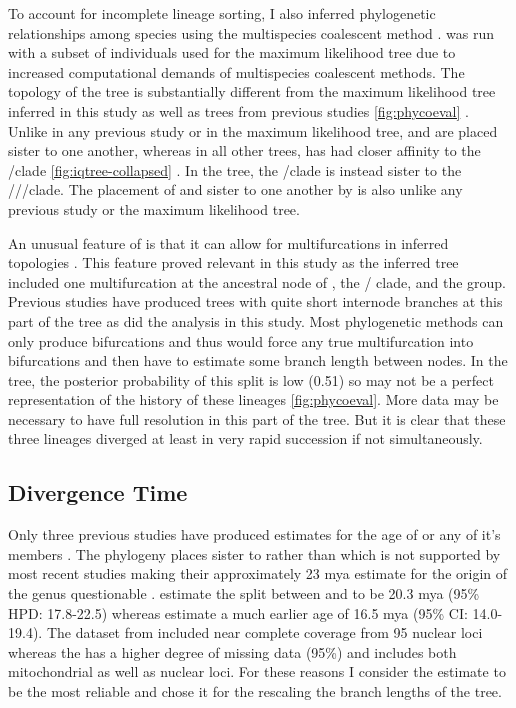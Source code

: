 To account for incomplete lineage sorting, I also inferred phylogenetic     
relationships among \anaxyrus species using the multispecies coalescent 
method \phycoeval. 
\phycoeval was run with a subset of individuals used for the maximum likelihood 
tree due to increased computational demands of multispecies coalescent methods. 
The topology of the \phycoeval tree is substantially different from the  
maximum likelihood tree inferred in this study as well as trees from previous 
studies \cref{fig:phycoeval} \parencite{fontenot2011,graybeal1997,masta2002,pramuk2007,pyron2011,portik2023}. 
Unlike in any previous study or in the maximum likelihood tree, \amer and \terr are 
placed sister to one another, whereas in all other trees, \amer has had closer 
affinity to the \hemiophrys/\baxteri clade \cref{fig:iqtree-collapsed} \parencite{pyron2011,portik2023}.
In the \phycoeval tree, the \hemiophrys/\baxteri clade is instead sister
to the \amer/\fowl/\terr/\wood clade.
The placement of \fowl and \wood sister to one another by \phycoeval is also  
unlike any previous study or the maximum likelihood tree.

An unusual feature of \phycoeval is that it can allow for multifurcations in  
inferred topologies \parencite{oaks2022}.
This feature proved relevant in this study as the inferred tree included
one multifurcation at the ancestral node of \quercicus, the \cognatus/\speciosus
clade, and the \americanus group. 
Previous studies have produced trees with quite short internode branches at this
part of the tree as did the \iqtree analysis in this study. 
Most phylogenetic methods can only produce bifurcations and thus would force any true 
multifurcation into bifurcations and then have to estimate some branch length between nodes. 
In the \phycoeval tree, the posterior probability of this split is low (0.51) so 
may not be a perfect representation of the history of these lineages \cref{fig:phycoeval}.
More data may be necessary to have full resolution in this part of the tree.
But it is clear that these three lineages diverged at least in very rapid succession
if not simultaneously. 

\subsection{Divergence Time}
Only three previous studies have produced estimates for the age of \anaxyrus
or any of it's members \cite{frazao2015,feng2017,portik2023}.
The \cite{frazao2015} phylogeny places \incilius sister to \rhinella rather 
than \incilius which is not supported by most recent studies making 
their approximately 23 mya estimate for the origin of the genus questionable \cite{feng2017,portik2023,pyron2011}. 
\cite{portik2023} estimate the split between \anaxyrus and \incilius to be
20.3 mya (95\% HPD: 17.8-22.5) whereas \cite{feng2017} estimate a much earlier 
age of 16.5 mya (95\% CI: 14.0-19.4).
The dataset from \cite{feng2017} included near complete coverage from 95 nuclear loci 
whereas the \cite{portik2023} has a higher degree of missing data (95\%)
and includes both mitochondrial as well as nuclear loci. 
For these reasons I consider the \cite{feng2017} estimate to be the most reliable
and chose it for the rescaling the branch lengths of the \phycoeval tree.

